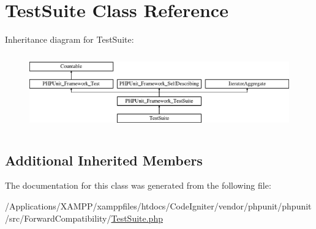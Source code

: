 \hypertarget{class_p_h_p_unit_1_1_framework_1_1_test_suite}{}\section{Test\+Suite Class Reference}
\label{class_p_h_p_unit_1_1_framework_1_1_test_suite}
Inheritance diagram for Test\+Suite\+:\begin{figure}[H]
\begin{center}
\leavevmode
\includegraphics[height=3.303835cm]{class_p_h_p_unit_1_1_framework_1_1_test_suite}
\end{center}
\end{figure}
\subsection*{Additional Inherited Members}


The documentation for this class was generated from the following file\+:\begin{DoxyCompactItemize}
\item 
/\+Applications/\+X\+A\+M\+P\+P/xamppfiles/htdocs/\+Code\+Igniter/vendor/phpunit/phpunit/src/\+Forward\+Compatibility/\mbox{\hyperlink{_forward_compatibility_2_test_suite_8php}{Test\+Suite.\+php}}\end{DoxyCompactItemize}

